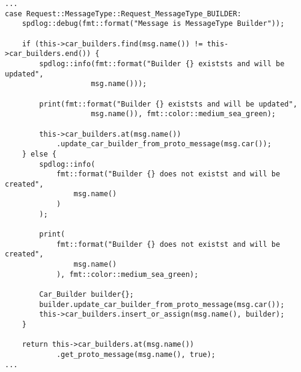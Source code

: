 \vspace{10mm}
\begin{addmargin}[-3em]{0em}
\begin{verbatim}
...
case Request::MessageType::Request_MessageType_BUILDER:
    spdlog::debug(fmt::format("Message is MessageType Builder"));

    if (this->car_builders.find(msg.name()) != this->car_builders.end()) {
        spdlog::info(fmt::format("Builder {} existsts and will be updated", 
                    msg.name()));
                    
        print(fmt::format("Builder {} existsts and will be updated", 
                    msg.name()), fmt::color::medium_sea_green);

        this->car_builders.at(msg.name())
            .update_car_builder_from_proto_message(msg.car());
    } else {
        spdlog::info(
            fmt::format("Builder {} does not existst and will be created", 
                msg.name()
            )
        );
        
        print(
            fmt::format("Builder {} does not existst and will be created", 
                msg.name()
            ), fmt::color::medium_sea_green);

        Car_Builder builder{};
        builder.update_car_builder_from_proto_message(msg.car());
        this->car_builders.insert_or_assign(msg.name(), builder);
    }

    return this->car_builders.at(msg.name())
            .get_proto_message(msg.name(), true);
...
\end{verbatim}
\end{addmargin}

